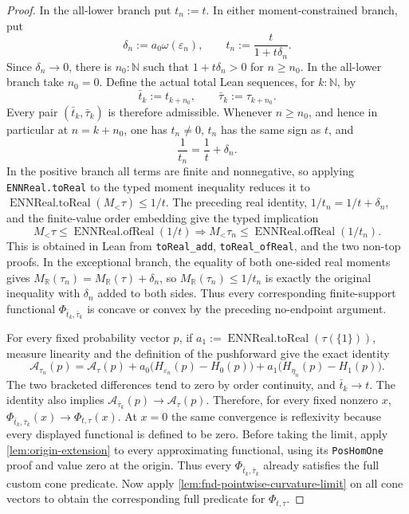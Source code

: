 \documentclass[9pt]{extarticle}
\theoremstyle{definition}
\theoremstyle{remark}
\newcommand{\R}{\mathbb R}
\newcommand{\N}{\mathbb N}
\newcommand{\A}{\mathcal A}
\newcommand{\eps}{\varepsilon}
\begin{document}
\begin{proof}
In the all-lower branch put $t_n:=t$.  In either moment-constrained branch,
put
\begin{equation}
 \delta_n:=a_0\omega(\eps_n),
 \qquad
 t_n:=\frac{t}{1+t\delta_n}.
 \label{eq:t-adjustment}
\end{equation}
Since $\delta_n\to0$, there is $n_0:\N$ such that
$1+t\delta_n>0$ for $n\geq n_0$.  In the all-lower branch take $n_0=0$.
Define the actual total Lean sequences, for $k:\N$, by
\[
 \bar t_k:=t_{k+n_0},\qquad \bar\tau_k:=\tau_{k+n_0}.
\]
Every pair $(\bar t_k,\bar\tau_k)$ is therefore admissible.  Whenever
$n\geq n_0$, and hence in particular at $n=k+n_0$, one has
$t_n\neq0$, $t_n$ has the same sign as $t$, and
\[
 \frac1{t_n}=\frac1t+\delta_n.
\]
In the positive branch all terms are finite and nonnegative, so applying
\texttt{ENNReal.toReal} to the typed moment inequality reduces it to
$\operatorname{ENNReal.toReal}(M_<\tau)\leq1/t$.  The preceding real identity,
$1/t_n=1/t+\delta_n$, and the finite-value order embedding give the typed
implication
\[
 M_<\tau\leq\operatorname{ENNReal.ofReal}(1/t)
 \Longrightarrow
 M_<\tau_n\leq\operatorname{ENNReal.ofReal}(1/t_n).
\]
This is obtained in Lean from \texttt{toReal\_add},
\texttt{toReal\_ofReal}, and the two non-top proofs.  In the exceptional
branch, the equality of both one-sided real moments gives
$M_{\R}(\tau_n)=M_{\R}(\tau)+\delta_n$, so
$M_{\R}(\tau_n)\leq1/t_n$ is exactly the original inequality with
$\delta_n$ added to both sides.  Thus every corresponding finite-support
functional $\Phi_{\bar t_k,\bar\tau_k}$ is concave or convex by the
preceding no-endpoint argument.

For every fixed probability vector $p$, if
$a_1:=\operatorname{ENNReal.toReal}(\tau(\{1\}))$, measure linearity and the definition of the
pushforward give the exact identity
\[
 \A_{\tau_n}(p)=\A_\tau(p)
 +a_0\bigl(H_{\eps_n}(p)-H_0(p)\bigr)
 +a_1\bigl(H_{\eta_n}(p)-H_1(p)\bigr).
\]
The two bracketed differences tend to zero by order continuity, and
$\bar t_k\to t$.  The identity also implies
$\A_{\bar\tau_k}(p)\to\A_\tau(p)$.  Therefore, for every fixed nonzero $x$,
$\Phi_{\bar t_k,\bar\tau_k}(x)\to\Phi_{t,\tau}(x)$.
At $x=0$ the same convergence is reflexivity because every displayed
functional is defined to be zero.  Before taking the limit, apply
\cref{lem:origin-extension} to every approximating functional, using its
\texttt{PosHomOne} proof and value zero at the origin.  Thus every
$\Phi_{\bar t_k,\bar\tau_k}$ already satisfies the full custom cone predicate.
Now apply \cref{lem:fnd-pointwise-curvature-limit} on all cone vectors to
obtain the corresponding full predicate for $\Phi_{t,\tau}$.
\end{proof}
\end{document}
